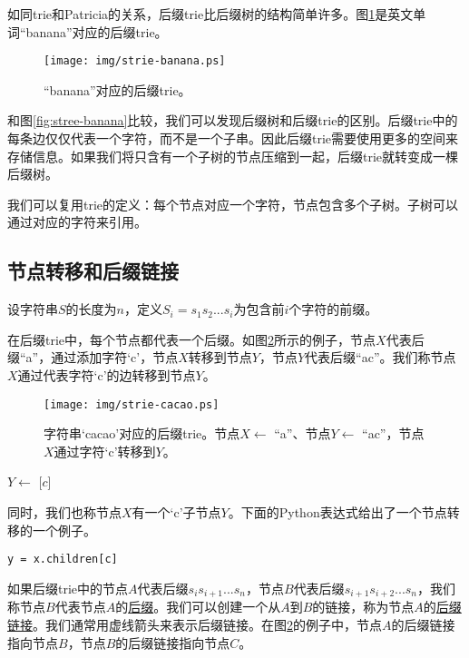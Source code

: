 \documentclass[UTF8]{article}
\begin{document}
如同trie和Patricia的关系，后缀trie比后缀树的结构简单许多。图\ref{fig:strie-banana}是英文单词“banana”对应的后缀trie。

\begin{figure}[htbp]
  \centering
  \texttt{[image: img/strie-banana.ps]}
  \caption{“banana”对应的后缀trie。} \label{fig:strie-banana}
\end{figure}

和图\ref{fig:stree-banana}比较，我们可以发现后缀树和后缀trie的区别。后缀trie中的每条边仅仅代表一个字符，而不是一个子串。因此后缀trie需要使用更多的空间来存储信息。如果我们将只含有一个子树的节点压缩到一起，后缀trie就转变成一棵后缀树。

我们可以复用trie的定义：每个节点对应一个字符，节点包含多个子树。子树可以通过对应的字符来引用。

\subsection{节点转移和后缀链接}

设字符串$S$的长度为$n$，定义$S_i=s_1s_2...s_i$为包含前$i$个字符的前缀。

在后缀trie中，每个节点都代表一个后缀。如图\ref{fig:strie-cacao}所示的例子，节点$X$代表后缀“a”，通过添加字符‘c’，节点$X$转移到节点$Y$，节点$Y$代表后缀“ac”。我们称节点$X$通过代表字符‘c’的边转移到节点$Y$\cite{ukkonen95}。

\begin{figure}[htbp]
  \centering
  \texttt{[image: img/strie-cacao.ps]}
  \caption{字符串‘cacao’对应的后缀trie。节点$X \gets$ “a”、节点$Y \gets$ “ac”，节点$X$通过字符‘c’转移到$Y$。}
  \label{fig:strie-cacao}
\end{figure}

\begin{algorithmic}
\State $Y \gets$ [$c$]
\end{algorithmic}

同时，我们也称节点$X$有一个‘c’子节点$Y$。下面的Python表达式给出了一个节点转移的一个例子。

\lstset{language=python}
\begin{lstlisting}
y = x.children[c]
\end{lstlisting}

如果后缀trie中的节点$A$代表后缀$s_is_{i+1}...s_n$，节点$B$代表后缀$s_{i+1}s_{i+2}...s_n$，我们称节点$B$代表节点$A$的\underline{后缀}。我们可以创建一个从$A$到$B$的链接，称为节点$A$的\underline{后缀链接}\cite{ukkonen95}。我们通常用虚线箭头来表示后缀链接。在图\ref{fig:strie-cacao}的例子中，节点$A$的后缀链接指向节点$B$，节点$B$的后缀链接指向节点$C$。
\end{document}
